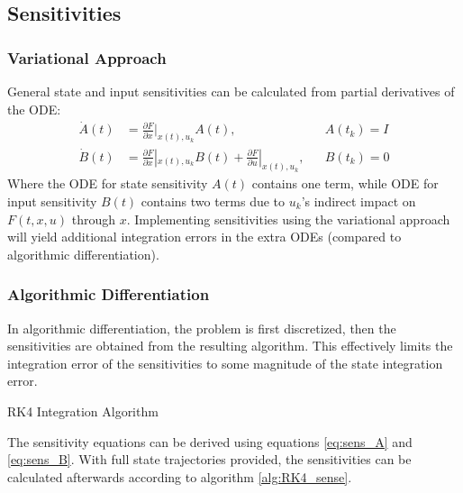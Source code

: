 \subsection{Sensitivities}


\subsubsection{Variational Approach}
General state and input sensitivities can be calculated from partial derivatives of the ODE:
\begin{align}
    \dot{A}(t) &= \frac{\partial F}{\partial x}|_{x(t),u_k} A(t), & &A(t_k) = I\label{eq:sens_A}\\
    \dot{B}(t) &= \frac{\partial F}{\partial x}|_{x(t), u_k} B(t) + \frac{\partial F}{\partial u}|_{x(t), u_k}, & &B(t_k) = 0 \label{eq:sens_B}
\end{align}
Where the ODE for state sensitivity $A(t)$ contains one term, while ODE for input sensitivity $B(t)$ contains two terms due to $u_k$'s indirect impact on $F(t, x, u)$ through $x$. Implementing sensitivities using the variational approach will yield additional integration errors in the extra ODEs (compared to algorithmic differentiation).

\subsubsection{Algorithmic Differentiation}
In algorithmic differentiation, the problem is first discretized, then the sensitivities are obtained from the resulting algorithm. This effectively limits the integration error of the sensitivities to some magnitude of the state integration error.
\begin{algorithm}[H]
\SetAlgoLined
{}
 \caption{RK4 Integration Algorithm}
\end{algorithm}
The sensitivity equations can be derived using equations \ref{eq:sens_A} and \ref{eq:sens_B}. With full state trajectories provided, the sensitivities can be calculated afterwards according to algorithm \ref{alg:RK4_sense}.

